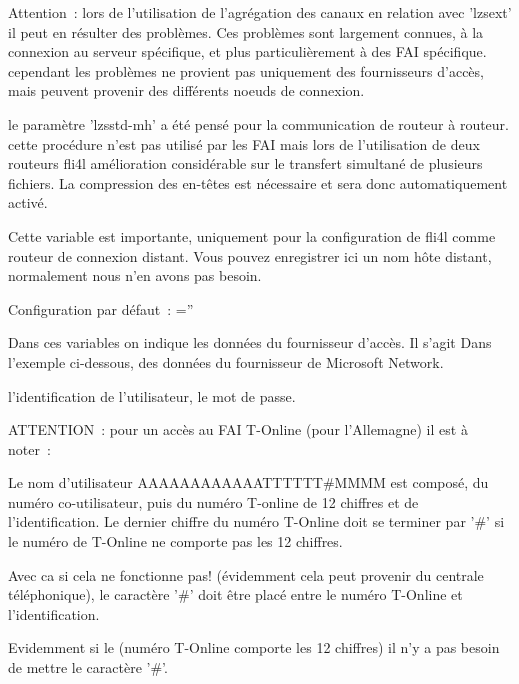 \begin{description}
  Attention~: lors de l'utilisation de l'agrégation des canaux en relation avec
  'lzsext' il peut en résulter des problèmes. Ces problèmes sont largement connues,
  à la connexion au serveur spécifique, et plus particulièrement à des FAI spécifique.
  cependant les problèmes ne provient pas uniquement des fournisseurs d'accès, mais
  peuvent provenir des différents noeuds de connexion.

  le paramètre 'lzsstd-mh' a été pensé pour la communication de routeur à routeur.
  cette procédure n'est pas utilisé par les FAI mais lors de l'utilisation de deux
  routeurs fli4l amélioration considérable sur le transfert simultané de plusieurs
  fichiers. La compression des en-têtes est nécessaire et sera donc automatiquement activé.


  Cette variable est importante, uniquement pour la configuration de fli4l comme
  routeur de connexion distant. Vous pouvez enregistrer ici un nom hôte distant,
  normalement nous n'en avons pas besoin.

  Configuration par défaut~: =''


  Dans ces variables on indique les données du fournisseur d'accès. Il s'agit
  Dans l'exemple ci-dessous, des données du fournisseur de Microsoft Network.

   l'identification de l'utilisateur,
   le mot de passe.

  ATTENTION~: pour un accès au FAI T-Online (pour l'Allemagne) il est à noter~:

  Le nom d'utilisateur AAAAAAAAAAAATTTTTT\#MMMM est composé, du numéro
  co-utilisateur, puis du numéro T-online de 12 chiffres et de
  l'identification. Le dernier chiffre du numéro T-Online doit se terminer
  par '\#' si le numéro de T-Online ne comporte pas les 12 chiffres.

  Avec ca si cela ne fonctionne pas! (évidemment cela peut provenir du centrale
  téléphonique), le caractère '\#' doit être placé entre le numéro T-Online
  et l'identification.

  Evidemment si le (numéro T-Online comporte les 12 chiffres) il n'y a pas
  besoin de mettre le caractère '\#'.


\end{description}
